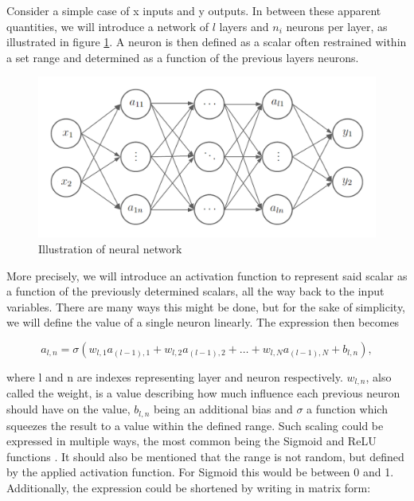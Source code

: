 Consider a simple case of x inputs and y outputs. In between these apparent quantities, we will introduce a network of $l$ layers and $n_i$ neurons per layer, as illustrated in figure \ref{fig:network}. A neuron is then defined as a scalar often restrained within a set range and determined as a function of the previous layers neurons.

\begin{figure}[H]
    \centering
    \includegraphics[scale=0.28]{Illustrations/neural.png}
    \caption{Illustration of neural network}
    \label{fig:network}
\end{figure}

More precisely, we will introduce an activation function to represent said scalar as a function of the previously determined scalars, all the way back to the input variables. There are many ways this might be done, but for the sake of simplicity, we will define the value of a single neuron linearly. The expression then becomes

\begin{equation}
    a_{l,n} = \sigma \left( w_{l,1} a_{(l-1),1} + w_{l,2} a_{(l-1),2} + \hdots + w_{l,N} a_{(l-1),N} + b_{l,n}\right),
    \label{activationfunction}
\end{equation}

where l and n are indexes representing layer and neuron respectively. $w_{l,n}$, also called the weight, is a value describing how much influence each previous neuron should have on the value, $b_{l,n}$ being an additional bias and $\sigma$ a function which squeezes the result to a value within the defined range. Such scaling could be expressed in multiple ways, the most common being the Sigmoid and ReLU functions \cite{activationfunction}. It should also be mentioned that the range is not random, but defined by the applied activation function. For Sigmoid this would be between 0 and 1. Additionally, the expression could be shortened by writing in matrix form:

